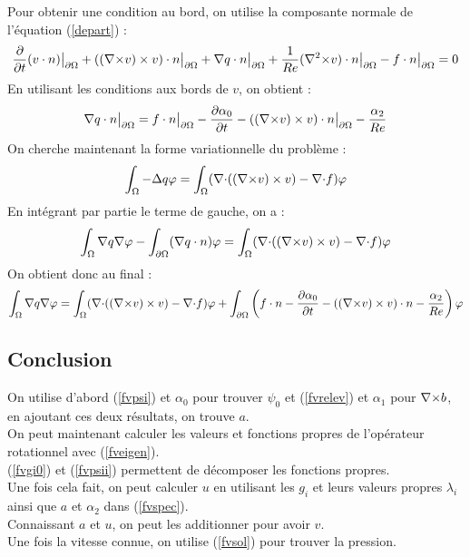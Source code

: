 Pour obtenir une condition au bord, on utilise la composante normale de l'équation (\ref{depart}) :
\[
\frac{\partial}{\partial t}(v\cdot n){\big\rvert_{\partial\Omega}} + (({\nabla\times} v)\times v)\cdot n{\big\rvert_{\partial\Omega}} + {\nabla} q\cdot n{\big\rvert_{\partial\Omega}} +\frac{1}{Re}({\nabla^2\times} v)\cdot n{\big\rvert_{\partial\Omega}} - f\cdot n{\big\rvert_{\partial\Omega}} = 0
\]
En utilisant les conditions aux bords de $v$, on obtient :
\[
{\nabla} q\cdot n{\big\rvert_{\partial\Omega}} =  f\cdot n{\big\rvert_{\partial\Omega}} - \frac{\partial\alpha_0}{\partial t} - (({\nabla\times} v)\times v)\cdot n{\big\rvert_{\partial\Omega}} - \frac{\alpha_2}{Re}
\]
On cherche maintenant la forme variationnelle du problème :
\[
\int_\Omega -{\Delta} q\varphi = \int_\Omega ({\nabla\cdot}(({\nabla\times} v)\times v) -{\nabla\cdot} f)\varphi
\] 
En intégrant par partie le terme de gauche, on a :
\[
\int_\Omega {\nabla} q{\nabla}\varphi - \int_{\partial\Omega} ({\nabla} q\cdot n)\varphi = \int_\Omega ({\nabla\cdot}(({\nabla\times} v)\times v) -{\nabla\cdot} f)\varphi
\]
On obtient donc au final :
\begin{eqnarray}
\label{fvsol}
\int_\Omega {\nabla} q{\nabla}\varphi = \int_\Omega ({\nabla\cdot}(({\nabla\times} v)\times v) -{\nabla\cdot} f)\varphi + \int_{\partial\Omega} \left(f\cdot n - \frac{\partial\alpha_0}{\partial t} - (({\nabla\times} v)\times v)\cdot n - \frac{\alpha_2}{Re}\right)\varphi
\end{eqnarray}

\subsection{Conclusion}

On utilise d'abord (\ref{fvpsi}) et $\alpha_0$ pour trouver $\psi_0$ et (\ref{fvrelev}) et $\alpha_1$ pour ${\nabla\times} b$, en ajoutant ces deux résultats, on trouve $a$.\\
On peut maintenant calculer les valeurs et fonctions propres de l'opérateur rotationnel avec (\ref{fveigen}).\\
(\ref{fvgi0}) et (\ref{fvpsii}) permettent de décomposer les fonctions propres.\\
Une fois cela fait, on peut calculer $u$ en utilisant les $g_i$ et leurs valeurs propres $\lambda_i$ ainsi que $a$ et $\alpha_2$ dans (\ref{fvspec}).\\
Connaissant $a$ et $u$, on peut les additionner pour avoir $v$.\\
Une fois la vitesse connue, on utilise (\ref{fvsol}) pour trouver la pression. 

